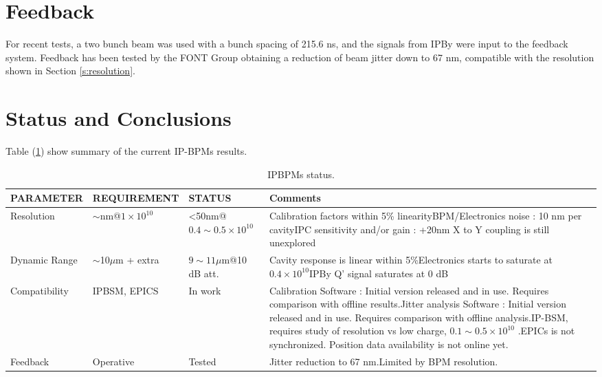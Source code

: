 \section{Feedback}
For recent tests, a two bunch beam was used with a bunch spacing of 215.6 ns, and the signals from IPBy were input to the feedback system. Feedback has been tested by the FONT Group \cite{FONTfb:2015} obtaining a reduction of beam jitter down to 67 nm, compatible with the resolution shown in Section \ref{s:resolution}.
\section{Status and Conclusions}
Table (\ref{t:IPBPMsStatus}) show summary of the current IP-BPMs results.\par
\begin{table}[hbt]
\centering
\scriptsize
\begin{tabular}{l|l|l|p{6cm}}\hline
PARAMETER & REQUIREMENT & STATUS & Comments\\\hline\hline
Resolution & $\sim$nm@$1\times10^{10}$ & <50nm@$0.4\sim0.5\times10^{10}$ & Calibration factors within 5\% linearity\newline BPM/Electronics noise : 10 nm per cavity\newline IPC sensitivity and/or gain : +20nm \newline X to Y coupling is still unexplored\\\hline
Dynamic Range & $\sim$10$\mu$m + extra & $9\sim11\mu$m@10 dB att. & Cavity response is linear within 5\%\newline Electronics starts to saturate at $0.4\times10^{10}$\newline IPBy Q' signal saturates at 0 dB\\\hline
Compatibility & IPBSM, EPICS & In work &Calibration Software : Initial version released and in use. Requires comparison with offline results.\newline Jitter analysis Software : Initial version released and in use. Requires comparison with offline analysis.\newline IP-BSM, requires study of resolution vs low charge, $0.1\sim0.5\times10^{10}$ .\newline EPICs is not synchronized. Position data availability is not online yet.\\\hline
Feedback & Operative & Tested	& Jitter reduction to 67 nm.\newline Limited by BPM resolution.\\\hline
\end{tabular}\caption{IPBPMs status.}\label{t:IPBPMsStatus}
\end{table}
